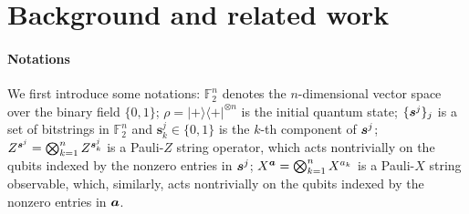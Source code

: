 \documentclass{article}
\theoremstyle{plain}
\theoremstyle{definition}
\theoremstyle{remark}
\begin{document}



\section{Background and related work} \label{sec:background}
\paragraph{Notations} We first introduce some notations: $\mathbb{F}_2^n$ denotes the $n$-dimensional vector space over the binary field $\{0,1\}$; $\rho = |+\rangle\!\langle+|^{\otimes n}$ is the initial quantum state; $\{{\bm{s}^j}\}_j$ is a set of bitstrings in $\mathbb{F}_2^n$ and $\bm{s}_k^j\in\{0,1\}$ is the $k$-th component of ${\bm{s}^j}$; $Z^{{\bm{s}^j}} = \bigotimes_{k=1}^n Z^{\bm{s}_k^j}$ is a Pauli-$Z$ string operator, which acts nontrivially on the qubits indexed by the nonzero entries in ${\bm{s}^j}$; $X^{\bm{a}} = \bigotimes_{k=1}^n X^{a_k}$ is a Pauli-$X$ string observable, which, similarly, acts nontrivially on the qubits indexed by the nonzero entries in ${\bm{a}}$.
\end{document}
